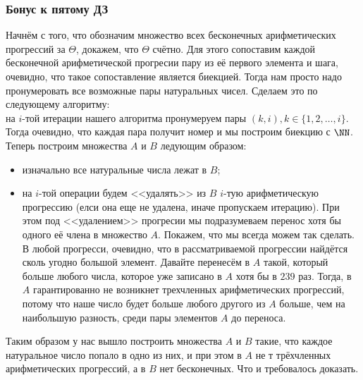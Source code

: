 \subsubsection{Бонус к пятому ДЗ}


Начнём с того, что обозначим множество всех бесконечных арифметических прогрессий за $\Theta$, докажем, что $\Theta$ счётно. Для этого сопоставим каждой бесконечной арифметической прогресии пару из её первого элемента и шага, очевидно, что такое сопоставление является биекцией. Тогда нам просто надо пронумеровать все возможные пары натуральных чисел. Сделаем это по следующему алгоритму:\\
на $i$-той итерации нашего алгоритма пронумеруем пары $(k, i), k \in \{1, 2, \ldots, i\}$. Тогда очевидно, что каждая пара получит номер и мы построим биекцию с $\NN$.\\
Теперь построим множества $A$ и $B$ ледующим образом:
\begin{itemize}
    \item изначально все натуральные числа лежат в $B$;
    \item на $i$-той операции будем <<удалять>> из $B$ $i$-тую арифметическую прогрессию (елси она еще не удалена, иначе пропускаем итерацию). При этом под <<удалением>> прогресии мы подразумеваем перенос хотя бы одного её члена в множество $A$. Покажем, что мы всегда можем так сделать. В любой прогресси, очевидно, что в рассматриваемой прогрессии найдётся сколь угодно большой элемент. Давайте перенесём в $A$ такой, который больше любого числа, которое уже записано в $A$ хотя бы в $239$ раз. Тогда, в $A$ гарантированно не возникнет трехчленных арифметических прогрессий, потому что наше число будет больше любого другого из $A$ больше, чем на наибольшую разность, среди пары элементов $A$ до переноса.
\end{itemize}
Таким образом у нас вышло построить множества $A$ и $B$ такие, что каждое натуральное число попало в одно из них, и при этом в $A$ не т трёхчленных арифметических прогрессий, а в $B$ нет бесконечных. Что и требовалось доказать.